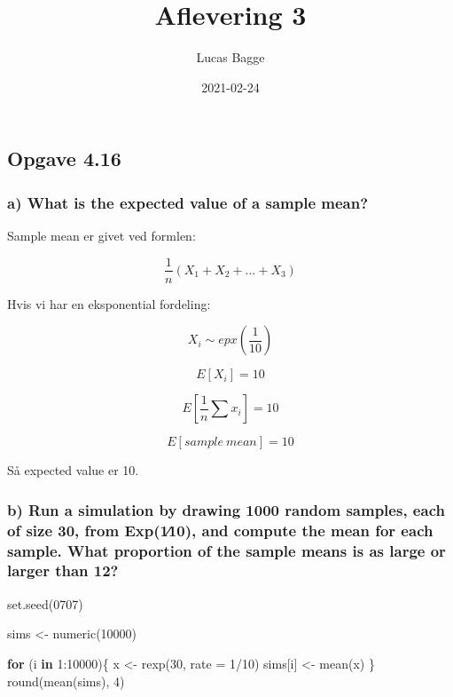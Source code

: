 \documentclass[
  a4paper]{article}
\title{Aflevering 3}
\author{Lucas Bagge}
\date{2021-02-24}
\newenvironment{Shaded}{\begin{snugshade}}{\end{snugshade}}
\newcommand{\AttributeTok}[1]{\textcolor[rgb]{0.77,0.63,0.00}{#1}}
\newcommand{\ControlFlowTok}[1]{\textcolor[rgb]{0.13,0.29,0.53}{\textbf{#1}}}
\newcommand{\DecValTok}[1]{\textcolor[rgb]{0.00,0.00,0.81}{#1}}
\newcommand{\FunctionTok}[1]{\textcolor[rgb]{0.00,0.00,0.00}{#1}}
\newcommand{\NormalTok}[1]{#1}
\newcommand{\OtherTok}[1]{\textcolor[rgb]{0.56,0.35,0.01}{#1}}
\newcommand{\SpecialCharTok}[1]{\textcolor[rgb]{0.00,0.00,0.00}{#1}}
\begin{document}
\maketitle

\hypertarget{opgave-4.16}{%
\subsection{Opgave 4.16}\label{opgave-4.16}}

\hypertarget{a-what-is-the-expected-value-of-a-sample-mean}{%
\subsubsection{a) What is the expected value of a sample
mean?}\label{a-what-is-the-expected-value-of-a-sample-mean}}

Sample mean er givet ved formlen:

\[
\frac{1}{n}(X_1+X_2+...+X_3)
\]

Hvis vi har en eksponential fordeling:

\[
X_i  \sim epx(\frac{1}{10})
\]

\[
E[X_i] = 10
\]

\[
E[\frac{1}{n} \sum x_i] =10
\]

\[
E[sample \ mean] = 10
\]

Så expected value er 10.

\hypertarget{b-run-a-simulation-by-drawing-1000-random-samples-each-of-size-30-from-exp110-and-compute-the-mean-for-each-sample.-what-proportion-of-the-sample-means-is-as-large-or-larger-than-12}{%
\subsubsection{b) Run a simulation by drawing 1000 random samples, each
of size 30, from Exp(1∕10), and compute the mean for each sample. What
proportion of the sample means is as large or larger than
12?}\label{b-run-a-simulation-by-drawing-1000-random-samples-each-of-size-30-from-exp110-and-compute-the-mean-for-each-sample.-what-proportion-of-the-sample-means-is-as-large-or-larger-than-12}}

\begin{Shaded}
\begin{Highlighting}[]
\FunctionTok{set.seed}\NormalTok{(}\DecValTok{0707}\NormalTok{)}

\NormalTok{sims }\OtherTok{\textless{}{-}} \FunctionTok{numeric}\NormalTok{(}\DecValTok{10000}\NormalTok{)}

\ControlFlowTok{for}\NormalTok{ (i }\ControlFlowTok{in} \DecValTok{1}\SpecialCharTok{:}\DecValTok{10000}\NormalTok{)\{}
\NormalTok{  x }\OtherTok{\textless{}{-}} \FunctionTok{rexp}\NormalTok{(}\DecValTok{30}\NormalTok{, }\AttributeTok{rate =} \DecValTok{1}\SpecialCharTok{/}\DecValTok{10}\NormalTok{)}
\NormalTok{  sims[i] }\OtherTok{\textless{}{-}} \FunctionTok{mean}\NormalTok{(x)}
\NormalTok{\}}
\FunctionTok{round}\NormalTok{(}\FunctionTok{mean}\NormalTok{(sims), }\DecValTok{4}\NormalTok{)}
\end{Highlighting}
\end{Shaded}
\end{document}
